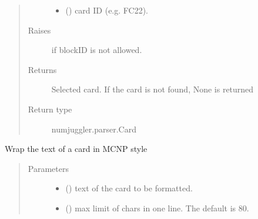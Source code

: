 \documentclass[letterpaper,10pt,english]{sphinxmanual}
\begin{document}
\begin{fulllineitems}
\begin{fulllineitems}
\begin{quote}
\begin{description}
\begin{itemize}
\item {} 
 () \textendash{} card ID (e.g. FC22).

\end{itemize}

\item[{Raises}] \leavevmode
{} \textendash{} if blockID is not allowed.

\item[{Returns}] \leavevmode
{} \textendash{} Selected card. If the card is not found, None is returned

\item[{Return type}] \leavevmode
numjuggler.parser.Card

\end{description}\end{quote}

\end{fulllineitems}


\begin{fulllineitems}
\label{\detokenize{api/inputgeneration:inputfile.InputFile.mcnp_wrap}}
Wrap the text of a card in MCNP style
\begin{quote}\begin{description}
\item[{Parameters}] \leavevmode\begin{itemize}
\item {} 
 () \textendash{} text of the card to be formatted.

\item {} 
 (\sphinxstyleliteralemphasis{\sphinxupquote{, }}) \textendash{} max limit of chars in one line. The default is 80.


\end{itemize}
\end{description}
\end{quote}
\end{fulllineitems}
\end{fulllineitems}
\end{document}
